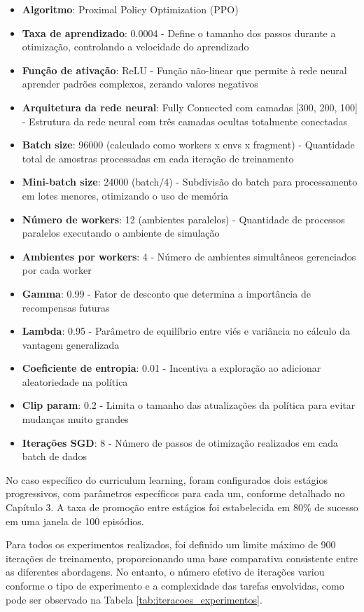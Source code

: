 \begin{itemize}
    \item \textbf{Algoritmo}: Proximal Policy Optimization (PPO) 
    \item \textbf{Taxa de aprendizado}: 0.0004 - Define o tamanho dos passos durante a otimização, controlando a velocidade do aprendizado
    \item \textbf{Função de ativação}: ReLU - Função não-linear que permite à rede neural aprender padrões complexos, zerando valores negativos
    \item \textbf{Arquitetura da rede neural}: Fully Connected com camadas [300, 200, 100] - Estrutura da rede neural com três camadas ocultas totalmente conectadas
    \item \textbf{Batch size}: 96000 (calculado como workers x envs x fragment) - Quantidade total de amostras processadas em cada iteração de treinamento
    \item \textbf{Mini-batch size}: 24000 (batch/4) - Subdivisão do batch para processamento em lotes menores, otimizando o uso de memória
    \item \textbf{Número de workers}: 12 (ambientes paralelos) - Quantidade de processos paralelos executando o ambiente de simulação
    \item \textbf{Ambientes por workers}: 4 - Número de ambientes simultâneos gerenciados por cada worker
    \item \textbf{Gamma}: 0.99 - Fator de desconto que determina a importância de recompensas futuras
    \item \textbf{Lambda}: 0.95 - Parâmetro de equilíbrio entre viés e variância no cálculo da vantagem generalizada
    \item \textbf{Coeficiente de entropia}: 0.01 - Incentiva a exploração ao adicionar aleatoriedade na política
    \item \textbf{Clip param}: 0.2 - Limita o tamanho das atualizações da política para evitar mudanças muito grandes
    \item \textbf{Iterações SGD}: 8 - Número de passos de otimização realizados em cada batch de dados
\end{itemize}

No caso específico do curriculum learning, foram configurados dois estágios progressivos, com parâmetros específicos para cada um, conforme detalhado no Capítulo 3. A taxa de promoção entre estágios foi estabelecida em 80\% de sucesso em uma janela de 100 episódios.

Para todos os experimentos realizados, foi definido um limite máximo de 900 iterações de treinamento, proporcionando uma base comparativa consistente entre as diferentes abordagens. No entanto, o número efetivo de iterações variou conforme o tipo de experimento e a complexidade das tarefas envolvidas, como pode ser observado na Tabela \ref{tab:iteracoes_experimentos}.

